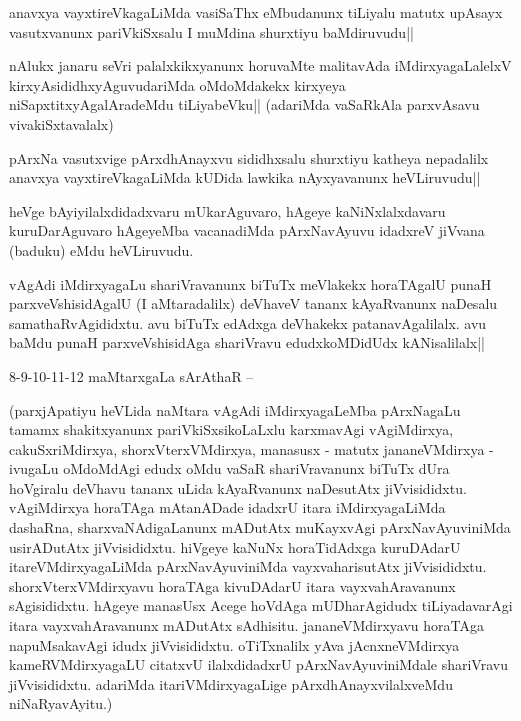 \stext


\begin{artha}
anavxya vayxtireVkagaLiMda vasiSaThx eMbudanunx tiLiyalu matutx 
upAsayx vasutxvanunx pariVkiSxsalu I muMdina shurxtiyu baMdiruvudu||
\end{artha}


\begin{artha}
nAlukx janaru seVri palalxkikxyanunx horuvaMte malitavAda 
iMdirxyagaLalelxV kirxyAsididhxyAguvudariMda oMdoMdakekx kirxyeya 
niSapxtitxyAgalAradeMdu tiLiyabeVku|| (adariMda vaSaRkAla parxvAsavu 
vivakiSxtavalalx)
\end{artha}

\begin{artha}
pArxNa vasutxvige pArxdhAnayxvu sididhxsalu shurxtiyu katheya 
nepadalilx anavxya vayxtireVkagaLiMda kUDida lawkika nAyxyavanunx 
heVLiruvudu||
\end{artha}


\begin{artha}
heVge bAyiyilalxdidadxvaru mUkarAguvaro, hAgeye kaNiNxlalxdavaru 
kuruDarAguvaro hAgeyeMba vacanadiMda pArxNavAyuvu idadxreV jiVvana 
(baduku) eMdu heVLiruvudu.
\end{artha}

\begin{artha}
vAgAdi iMdirxyagaLu shariVravanunx biTuTx meVlakekx horaTAgalU punaH 
parxveVshisidAgalU (I aMtaradalilx) deVhaveV tananx kAyaRvanunx 
naDesalu samathaRvAgididxtu. avu biTuTx edAdxga deVhakekx 
patanavAgalilalx. avu baMdu punaH parxveVshisidAga shariVravu 
edudxkoMDidUdx kANisalilalx||
\end{artha}

8-9-10-11-12 maMtarxgaLa sArAthaR --

(parxjApatiyu heVLida naMtara vAgAdi iMdirxyagaLeMba pArxNagaLu tamamx 
shakitxyanunx pariVkiSxsikoLaLxlu karxmavAgi vAgiMdirxya, 
cakuSxriMdirxya, shorxVterxVMdirxya, manasusx - matutx jananeVMdirxya 
- ivugaLu oMdoMdAgi edudx oMdu vaSaR shariVravanunx biTuTx dUra 
hoVgiralu deVhavu tananx uLida kAyaRvanunx naDesutAtx jiVvisididxtu. 
vAgiMdirxya horaTAga mAtanADade idadxrU itara iMdirxyagaLiMda 
dashaRna, sharxvaNAdigaLanunx mADutAtx muKayxvAgi pArxNavAyuviniMda 
usirADutAtx jiVvisididxtu. hiVgeye kaNuNx horaTidAdxga kuruDAdarU 
itareVMdirxyagaLiMda pArxNavAyuviniMda vayxvaharisutAtx jiVvisididxtu. 
shorxVterxVMdirxyavu horaTAga kivuDAdarU itara vayxvahAravanunx 
sAgisididxtu. hAgeye manasUsx Acege hoVdAga mUDharAgidudx 
tiLiyadavarAgi itara vayxvahAravanunx mADutAtx sAdhisitu. 
jananeVMdirxyavu horaTAga napuMsakavAgi idudx jiVvisididxtu. 
oTiTxnalilx yAva jAcnxneVMdirxya kameRVMdirxyagaLU citatxvU 
ilalxdidadxrU pArxNavAyuviniMdale shariVravu jiVvisididxtu. adariMda 
itariVMdirxyagaLige pArxdhAnayxvilalxveMdu niNaRyavAyitu.)

